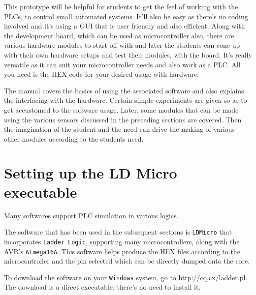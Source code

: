 \documentclass[12pt]{article}
\begin{document}
\vspace{12pt} 
This prototype will be helpful for students to get the feel of working with the PLCs, to control small automated systems. It'll also be easy as there's no coding involved and it's using a GUI that is user friendly and also efficient. Along with the development board, which can be used as microcontroller also, there are various hardware modules to start off with and later the students can cone up with their own hardware setups and test their modules, with the board. It's really versatile as it can suit your microcontroller needs and also work as a PLC. All you need is the HEX code for your desired usage with hardware.\vspace{12pt}


The manual covers the basics of using the associated software and also explains the interfacing with the hardware. Certain simple experiments are given so as to get accustomed to the software usage. Later, some modules that can be made using the various sensors discussed in the preceding sections are covered. Then the imagination of the student and the need can drive the making of various other modules  according to the students need.

\newpage
{\Large \section{Setting up the LD Micro executable}}
Many softwares support PLC simulation in various logics.

\vspace{12pt} 

The software that has been used in the subsequent sections is \texttt{LDMicro} that incorporates \texttt{Ladder Logic}, supporting many microcontrollers, along with the AVR's \texttt{ATmega16A}. This software helps produce the HEX files according to the microcontroller and the pin selected which can be directly dumped onto the core. \vspace{24pt}

 To download the software on your \texttt{Windows} system, go to  \url{http://cq.cx/ladder.pl}. The download is a direct executable, there's no need to install it.
\end{document}
